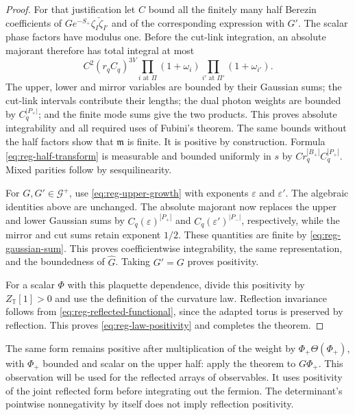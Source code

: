 \begin{proof}
For that justification let $C$ bound all the finitely many half
Berezin coefficients of $G e^{-S_+}\zeta_I\check\zeta_{I'}$ and of
the corresponding expression with $G'$. The scalar phase factors
have modulus one. Before the cut-link integration, an absolute
majorant therefore has total integral at most
\begin{equation}\label{eq:reg-representation-majorant}
 C^2(r_qC_q)^{3V}
       \prod_{i\text{ at }\Pi}(1+\omega_i)
       \prod_{i'\text{ at }\Pi'}(1+\omega_{i'}).
\end{equation}
The upper, lower and mirror variables are bounded by their
Gaussian sums; the cut-link intervals contribute their lengths;
the dual photon weights are bounded by $C_q^{|P_\times|}$; and the
finite mode sums give the two products. This proves absolute
integrability and all required uses of Fubini's theorem. The
same bounds without the half factors show that $\mathfrak m$ is
finite. It is positive by construction. Formula
\eqref{eq:reg-half-transform} is measurable and bounded uniformly
in $s$ by $Cr_q^{|B_+|}C_q^{|P_+|}$. Mixed parities follow by
sesquilinearity.

For $G,G'\in\mathcal G^+$, use
\eqref{eq:reg-upper-growth} with exponents $\varepsilon$ and
$\varepsilon'$. The algebraic identities above are unchanged.
The absolute majorant now replaces the upper and lower Gaussian
sums by $C_q(\varepsilon)^{|P_+|}$ and
$C_q(\varepsilon')^{|P_-|}$, respectively, while the mirror and
cut sums retain exponent $1/2$. These quantities are finite by
\eqref{eq:reg-gaussian-sum}. This proves coefficientwise
integrability, the same representation, and the boundedness of
$\widehat G$. Taking $G'=G$ proves positivity.

For a scalar $\Phi$ with this plaquette dependence, divide this positivity
by $Z_{\mathbb T}[1]>0$ and use the definition of the curvature
law. Reflection invariance follows from
\eqref{eq:reg-reflected-functional}, since the adapted torus is
preserved by reflection. This proves
\eqref{eq:reg-law-positivity} and completes the theorem.
\end{proof}

The same form remains positive after multiplication of the weight
by $\Phi_+\Theta(\Phi_+)$, with $\Phi_+$ bounded and scalar on the
upper half: apply the theorem to $G\Phi_+$. This observation will
be used for the reflected arrays of observables. It uses positivity
of the joint reflected form before integrating out the fermion.
The determinant's pointwise nonnegativity by itself does not imply
reflection positivity.


